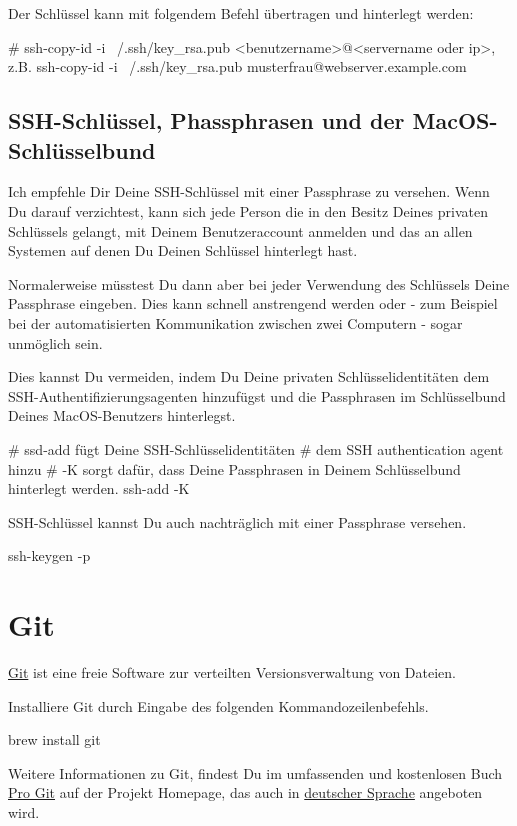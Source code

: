 \documentclass[]{article}
\begin{document}
Der Schlüssel kann mit folgendem Befehl übertragen und hinterlegt werden:
\begin{bashcode}
# ssh-copy-id -i ~/.ssh/key_rsa.pub <benutzername>@<servername oder ip>, z.B.
ssh-copy-id -i ~/.ssh/key_rsa.pub musterfrau@webserver.example.com
\end{bashcode}

\subsection{SSH-Schlüssel, Phassphrasen und der MacOS-Schlüsselbund}
Ich empfehle Dir Deine SSH-Schlüssel mit einer Passphrase zu versehen. Wenn Du darauf verzichtest, kann sich jede Person die in den Besitz Deines privaten Schlüssels gelangt, mit Deinem Benutzeraccount anmelden und das an allen Systemen auf denen Du Deinen Schlüssel hinterlegt hast.

Normalerweise müsstest Du dann aber bei jeder Verwendung des Schlüssels Deine Passphrase eingeben. Dies kann schnell anstrengend werden oder - zum Beispiel bei der automatisierten Kommunikation zwischen zwei Computern - sogar unmöglich sein.

Dies kannst Du vermeiden, indem Du Deine privaten Schlüsselidentitäten dem SSH-Authentifizierungsagenten hinzufügst und die Passphrasen im Schlüsselbund Deines MacOS-Benutzers hinterlegst. 

\begin{bashcode}
# ssd-add fügt Deine SSH-Schlüsselidentitäten
# dem SSH authentication agent hinzu
# -K sorgt dafür, dass Deine Passphrasen in Deinem Schlüsselbund hinterlegt werden.
ssh-add -K
\end{bashcode}

SSH-Schlüssel kannst Du auch nachträglich mit einer Passphrase versehen.
\begin{bashcode}
ssh-keygen -p
\end{bashcode}

\section{Git}
\href{https://git-scm.com/}{Git} ist eine freie Software zur verteilten Versionsverwaltung von Dateien.

Installiere Git durch Eingabe des folgenden Kommandozeilenbefehls.
\begin{bashcode}
brew install git
\end{bashcode}

Weitere Informationen zu Git, findest Du im umfassenden und kostenlosen Buch \href{https://git-scm.com/book/en/v2}{Pro Git} auf der Projekt Homepage, das auch in \href{https://git-scm.com/book/de/v2/}{deutscher Sprache} angeboten wird.
\end{document}
